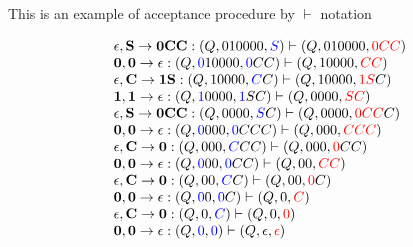 \documentclass[a4 paper]{article}
\begin{document}
This is an example of acceptance procedure by $\vdash$ notation

\begin{equation*}
    \begin{array}{l}
        \mathbf{\epsilon,S\to 0CC}: \left(Q,010000,\textcolor{blue}{S}\right)\vdash \left(Q,010000,\textcolor{red}{0CC}\right)\\
        
        \mathbf{0,0\to \epsilon}:\left(Q,\textcolor{blue}{0}10000,\textcolor{blue}{0}CC\right) \vdash \left(Q,10000,\textcolor{red}{CC}\right)\\
        
        \mathbf{\epsilon,C\to 1S}:\left(Q,10000,\textcolor{blue}{C}C\right)\vdash \left(Q,10000,\textcolor{red}{1S}C\right)  \\
        
        \mathbf{1,1\to \epsilon}:\left(Q,\textcolor{blue}{1}0000,\textcolor{blue}{1}SC\right) \vdash \left(Q,0000,\textcolor{red}{SC}\right)\\
        
         \mathbf{\epsilon,S\to 0CC}: \left(Q,0000,\textcolor{blue}{S}C\right)\vdash \left(Q,0000,\textcolor{red}{0CC}C\right)\\
        
         \mathbf{0,0\to \epsilon}:\left(Q,\textcolor{blue}{0}000,\textcolor{blue}{0}CCC\right) \vdash \left(Q,000,\textcolor{red}{CCC}\right)\\
        
        \mathbf{\epsilon,C\to 0}:\left(Q,000,\textcolor{blue}{C}CC\right)\vdash \left(Q,000,\textcolor{red}{0}CC\right)  \\
        
         \mathbf{0,0\to \epsilon}:\left(Q,\textcolor{blue}{0}00,\textcolor{blue}{0}CC\right) \vdash \left(Q,00,\textcolor{red}{CC}\right)\\
        
        \mathbf{\epsilon,C\to 0}:\left(Q,00,\textcolor{blue}{C}C\right)\vdash \left(Q,00,\textcolor{red}{0}C\right)  \\
        
         \mathbf{0,0\to \epsilon}:\left(Q,\textcolor{blue}{0}0,\textcolor{blue}{0}C\right) \vdash \left(Q,0,\textcolor{red}{C}\right)\\
        
        \mathbf{\epsilon,C\to 0}:\left(Q,0,\textcolor{blue}{C}\right)\vdash \left(Q,0,\textcolor{red}{0}\right)  \\
        
        \mathbf{0,0\to \epsilon}:\left(Q,\textcolor{blue}{0},\textcolor{blue}{0}\right) \vdash \left(Q,\epsilon,\textcolor{red}{\epsilon}\right)
    \end{array}
\end{equation*}
\end{document}
